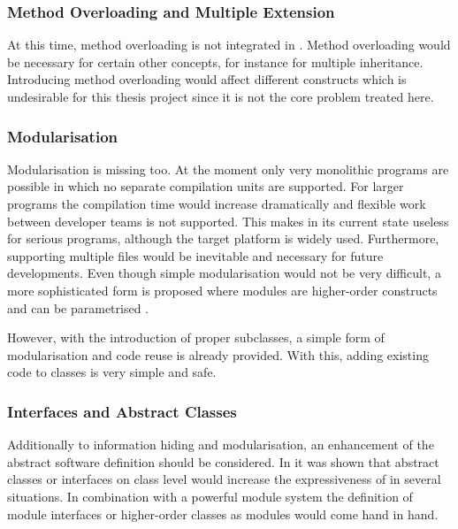 \subsubsection{Method Overloading and Multiple Extension}
At this time, method overloading is not integrated in \ooplss. Method
overloading would be necessary for certain other concepts, for instance
for multiple inheritance. Introducing method overloading would affect
different constructs which is undesirable for this thesis project since
it is not the core problem treated here.


\subsubsection{Modularisation}
Modularisation is missing too. At the moment only very monolithic programs
are possible in which no separate compilation units are supported. For larger
programs the compilation time would increase dramatically and flexible work between
developer teams is not supported. This makes \ooplss in its current state
useless for serious programs, although the target platform is widely
used. Furthermore, supporting multiple files would be inevitable and
necessary for future developments. Even though simple modularisation would not be
very difficult, a more sophisticated form is proposed where modules are
higher-order constructs and can be parametrised \cite{dreyer_type_2003}.

However, with the introduction of proper subclasses, a simple form of
modularisation and code reuse is already provided. With this, adding
existing code to classes is very simple and safe.

\subsubsection{Interfaces and Abstract Classes}
Additionally to information hiding and modularisation, an
enhancement of the abstract software definition should be considered. In
 it was shown that abstract classes or
interfaces on class level would increase the expressiveness of \ooplss
in several situations. In combination with a powerful module system
the definition of module interfaces or higher-order classes as modules
would come hand in hand.

